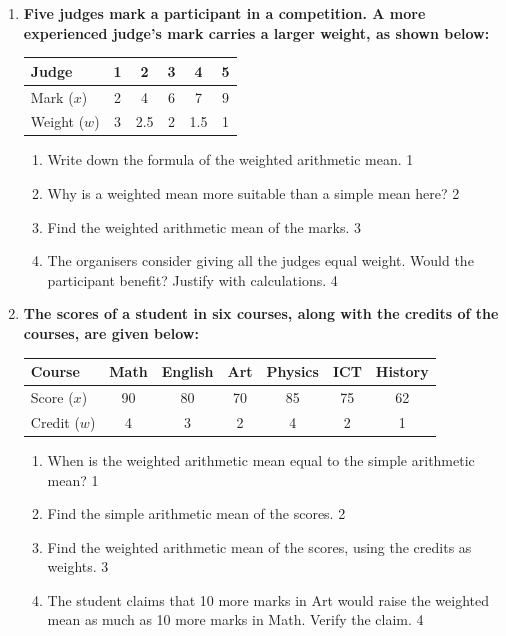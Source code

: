 \documentclass[a4paper,oneside]{book}
\begin{document}
\begin{enumerate}
\item
\textbf{Five judges mark a participant in a competition. A more experienced judge's mark carries a larger weight, as shown below:}
\begin{center}
\begin{tabular}{l|c|c|c|c|c}
Judge & 1 & 2 & 3 & 4 & 5 \\ \hline
Mark ($x$) & 2 & 4 & 6 & 7 & 9 \\ \hline
Weight ($w$) & 3 & 2.5 & 2 & 1.5 & 1
\end{tabular}
\end{center}
\begin{enumerate}
  \item Write down the formula of the weighted arithmetic mean. \hfill 1
  \item Why is a weighted mean more suitable than a simple mean here? \hfill 2
  \item Find the weighted arithmetic mean of the marks. \hfill 3
  \item The organisers consider giving all the judges equal weight. Would the participant benefit? Justify with calculations. \hfill 4
\end{enumerate}

\item
\textbf{The scores of a student in six courses, along with the credits of the courses, are given below:}
\begin{center}
\begin{tabular}{l|c|c|c|c|c|c}
Course & Math & English & Art & Physics & ICT & History \\ \hline
Score ($x$) & 90 & 80 & 70 & 85 & 75 & 62 \\ \hline
Credit ($w$) & 4 & 3 & 2 & 4 & 2 & 1
\end{tabular}
\end{center}
\begin{enumerate}
  \item When is the weighted arithmetic mean equal to the simple arithmetic mean? \hfill 1
  \item Find the simple arithmetic mean of the scores. \hfill 2
  \item Find the weighted arithmetic mean of the scores, using the credits as weights. \hfill 3
  \item The student claims that 10 more marks in Art would raise the weighted mean as much as 10 more marks in Math. Verify the claim. \hfill 4
\end{enumerate}



\end{enumerate}
\end{document}
